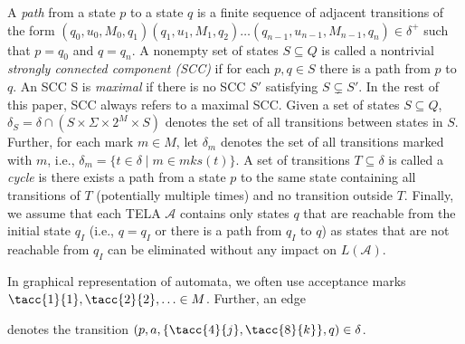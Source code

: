 \documentclass[a4paper,UKenglish,cleveref, autoref, thm-restate]{lipics-v2021}
\newcommand{\todo}[1]{\textcolor{red}{#1}}
\newcommand{\mks}{\mathit{mks}}
\newcommand{\mA}{\mathcal{A}}
\begin{document}
A \emph{path} from a state $p$ to a state $q$ is a finite sequence of
adjacent transitions of the form
$(q_0,u_0,M_0,q_1)(q_1,u_1,M_1,q_2)\dots(q_{n-1},u_{n-1},M_{n-1},q_n)\in\delta^+$
such that $p=q_0$ and $q=q_n$. A nonempty set of states $S\subseteq Q$
is called a nontrivial \emph{strongly connected component (SCC)} if
for each $p,q\in S$ there is a path from $p$ to $q$. An SCC S is
\emph{maximal} if there is no SCC $S'$ satisfying $S\subsetneq S'$. In
the rest of this paper, SCC always refers to a maximal SCC. Given a
set of states $S\subseteq Q$, $\delta_S=\delta\cap (S\times \Sigma \times 2^M \times S)$
denotes the set of all transitions between states in $S$. Further, for
each mark $m\in M$, let $\delta_m$ denotes the set of all transitions
marked with $m$, i.e., $\delta_m=\{t\in\delta\mid m\in
\mks(t)\}$.
A set of transitions $T\subseteq\delta$ is called a \emph{cycle} is
there exists a path from a state $p$ to the same state containing all
transitions of $T$ (potentially multiple times) and no transition
outside $T$. Finally, we assume that each TELA $\mA$ contains only
states $q$ that are reachable from the initial state $q_I$ (i.e.,
$q=q_I$ or there is a path from $q_I$ to $q$) as states that are not
reachable from $q_I$ can be eliminated without any impact on $L(\mA)$.

In graphical representation of automata, we often use acceptance marks
$\tacc{1}{1},\tacc{2}{2},\ldots\in M$. Further, an edge 
denotes the transition $(p,a,\{\tacc{4}{j},\tacc{8}{k}\},q)\in\delta$. 

\bigskip
\end{document}
